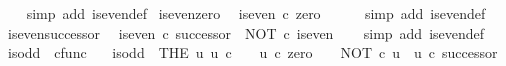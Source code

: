 \begin{isabellebody}
%
\isadelimproof
\ \ %
\endisadelimproof
%
\isatagproof
{}\isamarkupfalse%
\ {\isacharparenleft}{\kern0pt}simp\ add{\isacharcolon}{\kern0pt}\ is{\isacharunderscore}{\kern0pt}even{\isacharunderscore}{\kern0pt}def{}{\isacharparenright}{\kern0pt}%
\endisatagproof
{\isafoldproof}%
%
\isadelimproof
\isanewline
%
\endisadelimproof
\isanewline
{}\isamarkupfalse%
\ is{\isacharunderscore}{\kern0pt}even{\isacharunderscore}{\kern0pt}zero{\isacharcolon}{\kern0pt}\isanewline
\ \ {\isachardoublequoteopen}is{\isacharunderscore}{\kern0pt}even\ {\isasymcirc}\isactrlsub c\ zero\ {\isacharequal}{\kern0pt}\ {\isasymt}{\isachardoublequoteclose}\isanewline
%
\isadelimproof
\ \ %
\endisadelimproof
%
\isatagproof
{}\isamarkupfalse%
\ {\isacharparenleft}{\kern0pt}simp\ add{\isacharcolon}{\kern0pt}\ is{\isacharunderscore}{\kern0pt}even{\isacharunderscore}{\kern0pt}def{}{\isacharparenright}{\kern0pt}%
\endisatagproof
{\isafoldproof}%
%
\isadelimproof
\isanewline
%
\endisadelimproof
\isanewline
{}\isamarkupfalse%
\ is{\isacharunderscore}{\kern0pt}even{\isacharunderscore}{\kern0pt}successor{\isacharcolon}{\kern0pt}\isanewline
\ \ {\isachardoublequoteopen}is{\isacharunderscore}{\kern0pt}even\ {\isasymcirc}\isactrlsub c\ successor\ {\isacharequal}{\kern0pt}\ NOT\ {\isasymcirc}\isactrlsub c\ is{\isacharunderscore}{\kern0pt}even{\isachardoublequoteclose}\isanewline
%
\isadelimproof
\ \ %
\endisadelimproof
%
\isatagproof
{}\isamarkupfalse%
\ {\isacharparenleft}{\kern0pt}simp\ add{\isacharcolon}{\kern0pt}\ is{\isacharunderscore}{\kern0pt}even{\isacharunderscore}{\kern0pt}def{}{\isacharparenright}{\kern0pt}%
\endisatagproof
{\isafoldproof}%
%
\isadelimproof
%
\endisadelimproof
%
\isadelimdocument
%
\endisadelimdocument
%
\isatagdocument
%
\isamarkuptrue%
%
\endisatagdocument
{\isafolddocument}%
%
\isadelimdocument
%
\endisadelimdocument
{}\isamarkupfalse%
\ is{\isacharunderscore}{\kern0pt}odd\ {\isacharcolon}{\kern0pt}{\isacharcolon}{\kern0pt}\ {\isachardoublequoteopen}cfunc{\isachardoublequoteclose}\ \isanewline
\ \ {\isachardoublequoteopen}is{\isacharunderscore}{\kern0pt}odd\ {\isacharequal}{\kern0pt}\ {\isacharparenleft}{\kern0pt}THE\ u{\isachardot}{\kern0pt}\ u{\isacharcolon}{\kern0pt}\ {\isasymnat}\isactrlsub c\ {\isasymrightarrow}\ {\isasymOmega}\ {\isasymand}\ u\ {\isasymcirc}\isactrlsub c\ zero\ {\isacharequal}{\kern0pt}\ {\isasymf}\ {\isasymand}\ NOT\ {\isasymcirc}\isactrlsub c\ u\ {\isacharequal}{\kern0pt}\ u\ {\isasymcirc}\isactrlsub c\ successor{\isacharparenright}{\kern0pt}{\isachardoublequoteclose}\isanewline

\end{isabellebody}
